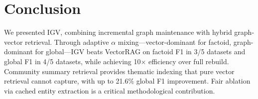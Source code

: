 \documentclass[sigconf,anonymous,review]{acmart}
\begin{document}
\section{Conclusion}

We presented IGV, combining incremental graph maintenance with hybrid graph-vector retrieval. Through adaptive $\alpha$ mixing---vector-dominant for factoid, graph-dominant for global---IGV beats VectorRAG on factoid F1 in 3/5 datasets and global F1 in 4/5 datasets, while achieving 10$\times$ efficiency over full rebuild. Community summary retrieval provides thematic indexing that pure vector retrieval cannot capture, with up to 21.6\% global F1 improvement. Fair ablation via cached entity extraction is a critical methodological contribution.



\end{document}
